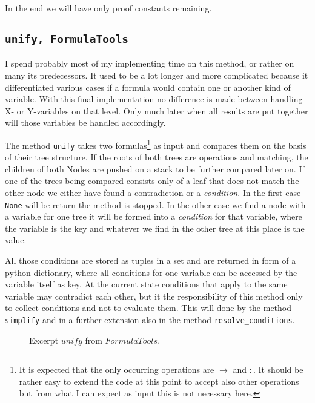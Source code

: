 In the end we will have only proof constants remaining.

\subsection[unify]{\texttt{unify, FormulaTools}}
I spend probably most of my implementing time on this method, or rather on many its predecessors. It used to be a lot longer and more complicated because it differentiated various cases if a formula would contain one or another kind of variable.
With this final implementation no difference is made between handling X- or Y-variables on that level. Only much later when all results are put together will those variables be handled accordingly.

The method \texttt{unify} takes two formulas\footnote{It is expected that the only occurring operations are $\rightarrow$ and $:$. It should be rather easy to extend the code at this point to accept also other operations but from what I can expect as input this is not necessary here.} as input and compares them on the basis of their tree structure. If the roots of both trees are operations and matching, the children of both Nodes are pushed on a stack to be further compared later on. If one of the trees being compared consists only of a leaf that does not match the other node we either have found a contradiction or a \emph{condition}. In the first case \texttt{None} will be return the method is stopped. In the other case we find a node with a variable for one tree it will be formed into a \emph{condition} for that variable, where the variable is the key and whatever we find in the other tree at this place is the value.

All those conditions are stored as tuples in a set and are returned in form of a python dictionary, where all conditions for one variable can be accessed by the variable itself as key. At the current state conditions that apply to the same variable may contradict each other, but it the responsibility of this method only to collect conditions and not to evaluate them. This will done by the method \texttt{simplify} and in a further extension also in the method \texttt{resolve\_conditions}.

\begin{figure}[H]
	\caption{Excerpt $unify$ from $FormulaTools$.}
	\vspace{-10pt}
	
	\vspace{-10pt}
\end{figure}


